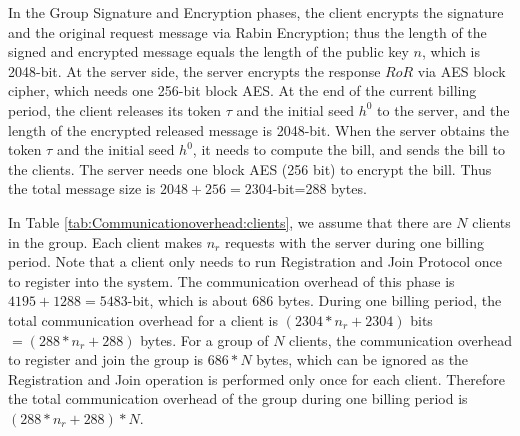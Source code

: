 \documentclass[letterpaper,12pt]{article}
\begin{document}
In the Group Signature and Encryption phases, the client encrypts the signature and the original request message via Rabin Encryption; thus the length of the signed and encrypted message equals the length of the public key $n$, which is 2048-bit. At the server side, the server encrypts the response $RoR$ via AES block cipher, which needs one 256-bit block AES.  At the end of the current billing period, the client releases its token $\tau$ and the initial seed $h^0$ to the server, and  the length of the encrypted released message is 2048-bit. When the server obtains the token $\tau$ and the initial seed $h^0$,  it needs to compute the bill, and sends the bill to the clients. The server needs one block AES (256 bit) to encrypt the bill.  Thus the total message size is $2048+256=2304$-bit=288 bytes.


In Table \ref{tab:Communicationoverhead:clients}, we assume that there are $N$ clients in the group. Each client makes $n_r$ requests with the server during one billing period. Note that a client only needs to run Registration and Join Protocol once to register into the system. The communication overhead of this phase is $4195+1288=5483$-bit, which is about 686 bytes. During one billing period, the total communication overhead for a client is $(2304*n_r+2304)$ bits $=(288*n_r+288)$ bytes. For a group of $N$ clients, the communication overhead to register and join the group is $686*N$ bytes, which can be ignored as the Registration and Join operation is performed only once for each client. Therefore the total communication overhead of the group during one billing period is $(288*n_r+288)*N$.
\end{document}
